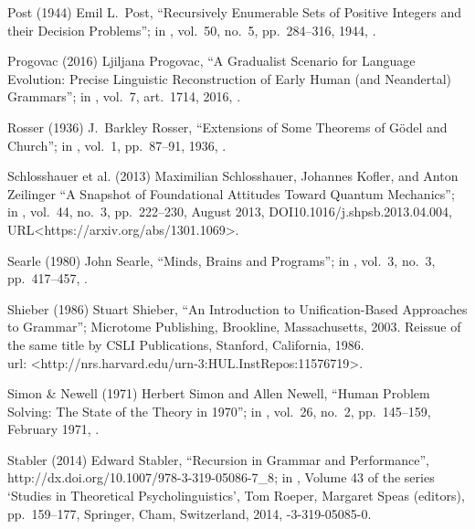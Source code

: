  Post (1944)
Emil L.\ Post,
``Recursively Enumerable Sets of Positive Integers
  and their Decision Problems'';
in ,
vol.\ 50, no.~5, pp.\ 284--316, 1944,
.

 Progovac (2016)
Ljiljana Progovac,
``A Gradualist
Scenario for Language Evolution:
Precise Linguistic Reconstruction of
Early Human (and Neandertal) Grammars'';
in ,
vol.\ 7, art.\ 1714, 2016,
.

 Rosser (1936)
J.\ Barkley Rosser,
``Extensions of Some Theorems of G\"odel and Church'';
in ,
vol.\ 1, pp.\ 87--91, 1936,
.

 Schlosshauer et al. (2013)
Maximilian Schlosshauer, Johannes Kofler, and Anton Zeilinger
``A Snapshot of Foundational Attitudes Toward Quantum Mechanics'';
in ,
vol.\ 44, no.\ 3, pp.\ 222--230, August 2013,
DOI{10.1016/j.shpsb.2013.04.004},
URL<https://arxiv.org/abs/1301.1069>.

 Searle (1980)
John Searle,
``Minds, Brains and Programs'';
in ,
vol.\ 3, no.\ 3, pp.\ 417--457,
.

 Shieber (1986)
Stuart Shieber,
``An Introduction to Unification-Based Approaches to Grammar'';
Microtome Publishing, Brookline, Massachusetts, 2003.
Reissue of the same title by
CSLI Publications, Stanford, California, 1986.\\
{\sc url:} \URL<http://nrs.harvard.edu/urn-3:HUL.InstRepos:11576719>.

 Simon \& Newell (1971)
Herbert Simon and Allen Newell,
``Human Problem Solving: The State of the Theory in 1970'';
in ,
 vol.\ 26, no.\ 2, pp.\ 145--159, February 1971,
.

 Stabler (2014)
Edward Stabler,
``Recursion in Grammar and Performance'',\\
%
{http://dx.doi.org/10.1007/978-3-319-05086-7_8};
in ,
Volume 43 of the series `Studies in Theoretical Psycholinguistics',
Tom Roeper, Margaret Speas (editors),
pp.\ 159--177,
Springer, Cham, Switzerland, 2014,
-3-319-05085-0.

